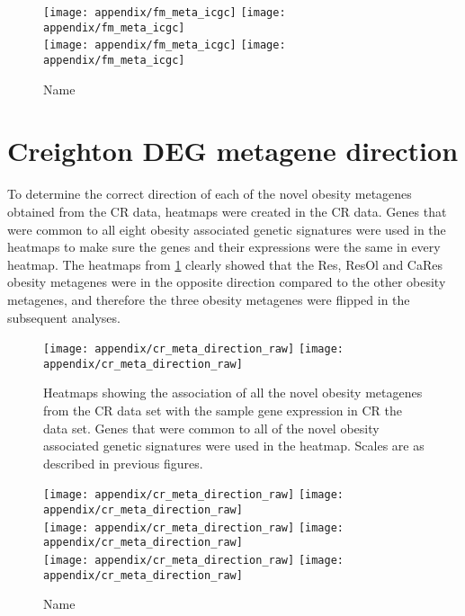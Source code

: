 \begin{appendices}
	\begin{figure}[htpb]
		\ContinuedFloat
		\captionsetup{list=off,format=cont}
		\centering
		\texttt{[image: appendix/fm\_meta\_icgc]}
		\hfill
		\texttt{[image: appendix/fm\_meta\_icgc]}\\
		\texttt{[image: appendix/fm\_meta\_icgc]}
		\hfill
		\texttt{[image: appendix/fm\_meta\_icgc]}\\
		\caption{Name}
	\end{figure}

	\section{Creighton DEG metagene direction}
	\label{sec:creighton_deg_metagene_direction}

	To determine the correct direction of each of the novel obesity metagenes obtained from the CR data, heatmaps were created in the CR data.
	Genes that were common to all eight obesity associated genetic signatures were used in the heatmaps to make sure the genes and their expressions were the same in every heatmap.
	The heatmaps from \cref{fig:cr_meta_direction} clearly showed that the Res, ResOl and CaRes obesity metagenes were in the opposite direction compared to the other obesity metagenes, and therefore the three obesity metagenes were flipped in the subsequent analyses.

	\begin{figure}[htpb]
		\centering
		\texttt{[image: appendix/cr\_meta\_direction\_raw]}
		\hfill
		\texttt{[image: appendix/cr\_meta\_direction\_raw]}\\
		\caption{Heatmaps showing the association of all the novel obesity metagenes from the CR data set with the sample gene expression in CR the data set.
		Genes that were common to all of the novel obesity associated genetic signatures were used in the heatmap.
		Scales are as described in previous figures.}
		\label{fig:cr_meta_direction}
	\end{figure}

	\begin{figure}[htpb]
		\ContinuedFloat
		\captionsetup{list=off,format=cont}
		\centering
		\texttt{[image: appendix/cr\_meta\_direction\_raw]}
		\hfill
		\texttt{[image: appendix/cr\_meta\_direction\_raw]}\\
		\vspace{1em}
		\texttt{[image: appendix/cr\_meta\_direction\_raw]}
		\hfill
		\texttt{[image: appendix/cr\_meta\_direction\_raw]}\\
		\vspace{1em}
		\texttt{[image: appendix/cr\_meta\_direction\_raw]}
		\hfill
		\texttt{[image: appendix/cr\_meta\_direction\_raw]}\\
		\caption{Name}
	\end{figure}


\end{appendices}
